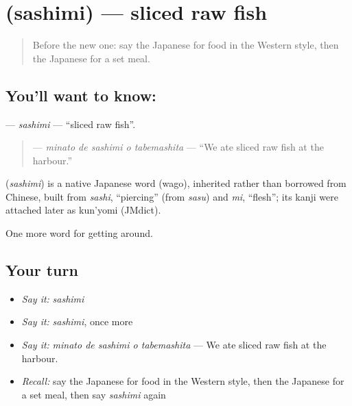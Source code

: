 \section[\texorpdfstring{\ja{さしみ} (sashimi)}{さしみ (sashimi)}]{ (sashimi) — sliced raw fish}

\label{lesson:JA-C422-sashimi}



\begin{quote}
Before the new one: say the Japanese for food in the Western style, then the Japanese for a set meal.
\end{quote}

\subsection*{You'll want to know: }
\textbf{} — \emph{sashimi} — \textquotedblleft{}sliced raw fish\textquotedblright{}.

\begin{quote}
\textbf{  } — \emph{minato de sashimi o tabemashita} — \textquotedblleft{}We ate sliced raw fish at the harbour.\textquotedblright{}
\end{quote}

\begin{cousinweb}
\textbf{} (\emph{sashimi}) is a native Japanese word (wago), inherited rather than borrowed from Chinese, built from \emph{sashi}, \textquotedblleft{}piercing\textquotedblright{} (from \emph{sasu}) and \emph{mi}, \textquotedblleft{}flesh\textquotedblright{}; its kanji were attached later as kun'yomi (JMdict).
\end{cousinweb}

\begin{grammarlens}[title={What you've built}]
One more word for getting around.
\end{grammarlens}

\subsection*{Your turn}
\begin{itemize}
\raggedright
  \item \emph{Say it:} \emph{sashimi}
  \item \emph{Say it:} \emph{sashimi}, once more
  \item \emph{Say it:} \emph{minato de sashimi o tabemashita} — We ate sliced raw fish at the harbour.
  \item \emph{Recall:} say the Japanese for food in the Western style, then the Japanese for a set meal, then say \emph{sashimi} again
\end{itemize}

